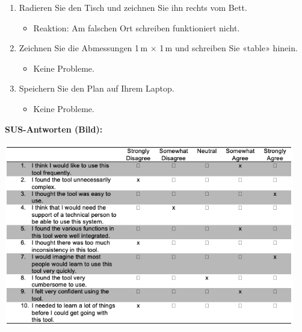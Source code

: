 \begin{enumerate}
    \item Radieren Sie den Tisch und zeichnen Sie ihn rechts vom Bett.
    \begin{itemize}
        \item Reaktion: Am falschen Ort schreiben funktioniert nicht.
    \end{itemize}

    \item Zeichnen Sie die Abmessungen 1\,m $\times$ 1\,m und schreiben Sie «table» hinein.
    \begin{itemize}
        \item Keine Probleme.
    \end{itemize}

    \item Speichern Sie den Plan auf Ihrem Laptop.
    \begin{itemize}
        \item Keine Probleme.
    \end{itemize}
\end{enumerate}

\clearpage

\textbf{SUS-Antworten (Bild):}
\begin{center}
    \includegraphics[width=0.95\textwidth]{graphics/sus_person2.png}
\end{center}

